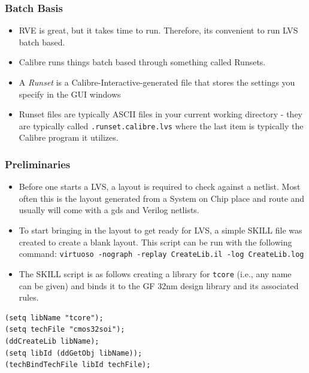 \documentclass{beamer}
\begin{document}
\begin{frame}[fragile]
\frametitle{Batch Basis}
\begin{itemize}
\item RVE is great, but it takes time to run.  Therefore, its
  convenient to run LVS batch based.
\item Calibre runs things batch based through something called
  Runsets.
\item A \textit{Runset} is a Calibre-Interactive-generated file that stores the
  settings you specify in the GUI windows
\item Runset files are typically ASCII files in your current working
  directory - they are typically called \verb+.runset.calibre.lvs+
  where the last item is typically the Calibre program it utilizes. 
\end{itemize}
\end{frame}
\begin{frame}[fragile]
\frametitle{Preliminaries}
\begin{itemize}
\item Before one starts a LVS, a layout is required to check against a
  netlist.  Most often this is the layout generated from a System on
  Chip place and route and usually will come with a gds and Verilog
  netlists.
\item To start bringing in the layout to get ready for LVS, a simple
  SKILL file was created to create a blank layout.  This script can be
  run with the following 
  command: \verb+virtuoso -nograph -replay CreateLib.il -log CreateLib.log+
\item The SKILL script is as follows creating a library for
  \verb+tcore+ (i.e., any name can be given) and binds it to the
  GF 32nm design library and its associated rules.
\end{itemize}
\footnotesize
\begin{verbatim}
(setq libName "tcore");
(setq techFile "cmos32soi");
(ddCreateLib libName);
(setq libId (ddGetObj libName));
(techBindTechFile libId techFile);
\end{verbatim}
\normalsize
\end{frame}
\end{document}
